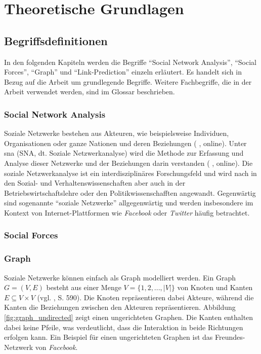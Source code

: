 \chapter{Theoretische Grundlagen}

\section{Begriffsdefinitionen}
In den folgenden Kapiteln werden die Begriffe ``Social Network Analysis'', ``Social Forces'', ``Graph'' und ``Link-Prediction'' einzeln
erläutert. Es handelt sich in Bezug auf die Arbeit um grundlegende Begriffe. Weitere Fachbegriffe, die
in der Arbeit verwendet werden, sind im Glossar beschrieben.

\subsection{Social Network Analysis}
Soziale Netzwerke bestehen aus Akteuren, wie beispielsweise Individuen, Organisationen oder ganze Nationen und deren Beziehungen (\citeauthor{ulrike_baumol_soziale_2019} \citeyear{ulrike_baumol_soziale_2019}, online).
Unter \acl{sna} (SNA, dt. Soziale Netzwerkanalyse) wird die Methode zur Erfassung und Analyse dieser Netzwerke und der Beziehungen darin verstanden (\citeauthor{wikipedia_soziale_2019} \citeyear{wikipedia_soziale_2019}, online).
Die soziale Netzwerkanalyse ist ein interdisziplinäres Forschungsfeld und wird nach \cite{ulrike_baumol_soziale_2019} in den Sozial- und Verhaltenswissenschaften aber auch in der Betriebswirtschaftslehre oder den Politikwissenschafften angewandt.
Gegenwärtig sind sogenannte ``soziale Netzwerke'' allgegenwärtig und werden insbesondere im Kontext von Internet-Plattformen wie \textit{Facebook} oder \textit{Twitter} häufig betrachtet.

\subsection{Social Forces}
\label{socialforces}

\subsection{Graph}
Soziale Netzwerke können einfach als Graph modelliert werden.
Ein Graph $G = (V, E)$ besteht aus einer Menge $V = \{1,2,...,|V|\}$ von Knoten und Kanten $E \subseteq V\times V $ (vgl. \citeauthor{ottmann_algorithmen_2017} \citeyear{ottmann_algorithmen_2017}, S. 590).
Die Knoten repräsentieren dabei Akteure, während die Kanten die Beziehungen zwischen den Akteuren repräsentieren.
Abbildung \ref{fig:graph_undirected} zeigt einen ungerichteten Graphen. Die Kanten enthalten dabei keine Pfeile, was verdeutlicht, dass die Interaktion in beide Richtungen erfolgen kann.
Ein Beispiel für einen ungerichteten Graphen ist das Freundes-Netzwerk von \textit{Facebook}.

